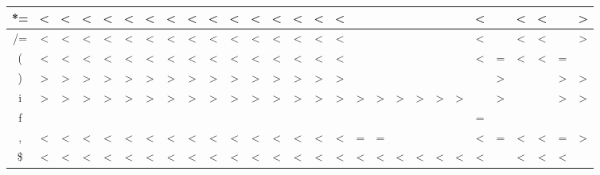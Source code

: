 \documentclass[11pt]{article}
\begin{document}
\begin{landscape}
\begin{tabular}{ |c||c|c|c|c|c|c|c|c|c|c|c|c|c|c|c|c|c|c|c|c|c|c|c|c|c|c|c| }
    *= &<&<&<&<&<&<&<&<&<&<&<&<&<&<&<&&&&&&&<&&<&<&&> \\ \hline
    /= &<&<&<&<&<&<&<&<&<&<&<&<&<&<&<&&&&&&&<&&<&<&&> \\ \hline
     ( &<&<&<&<&<&<&<&<&<&<&<&<&<&<&<&&&&&&&<&=&<&<&=& \\ \hline
     ) &>&>&>&>&>&>&>&>&>&>&>&>&>&>&>&&&&&&&&>&&&>&> \\ \hline
     i &>&>&>&>&>&>&>&>&>&>&>&>&>&>&>&>&>&>&>&>&>&&>&&&>&> \\ \hline
     f &&&&&&&&&&&&&&&&&&&&&&=&&&&& \\ \hline
     , &<&<&<&<&<&<&<&<&<&<&<&<&<&<&<&=&=&&&&&<&=&<&<&=&> \\ \hline
     \$ &<&<&<&<&<&<&<&<&<&<&<&<&<&<&<&<&<&<&<&<&<&<&&<&<&<& \\ \hline
     
\end{tabular}
\vfill
\raisebox{0.1cm}{\makebox[\linewidth]{\thepage}}
\end{landscape}
\end{document}
